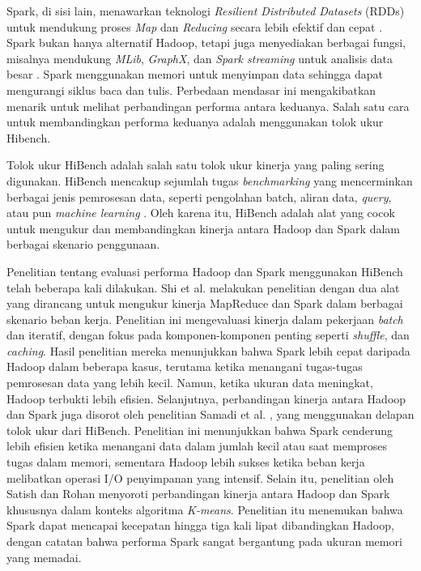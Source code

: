 Spark, di sisi lain, menawarkan teknologi \textit{Resilient Distributed Datasets} (RDDs) untuk mendukung proses \textit{Map} dan \textit{Reducing} secara lebih efektif dan cepat \cite{ahmadvandGapproxUsingGallup2019}. Spark bukan hanya alternatif Hadoop, tetapi juga menyediakan berbagai fungsi, misalnya mendukung \textit{MLib}, \textit{GraphX}, dan \textit{Spark streaming} untuk analisis data besar \cite{zahariaSparkClusterComputing2010}. Spark menggunakan memori untuk menyimpan data sehingga dapat mengurangi siklus baca dan tulis. Perbedaan mendasar ini mengakibatkan menarik untuk melihat perbandingan performa antara keduanya. Salah satu cara untuk membandingkan performa keduanya adalah menggunakan tolok ukur Hibench.

Tolok ukur HiBench adalah salah satu tolok ukur kinerja yang paling sering digunakan. HiBench mencakup sejumlah tugas \textit{benchmarking} yang mencerminkan berbagai jenis pemrosesan data, seperti pengolahan batch, aliran data, \textit{query}, atau pun \textit{machine learning} \cite{huangHiBenchBenchmarkSuite}. Oleh karena itu, HiBench adalah alat yang cocok untuk mengukur dan membandingkan kinerja antara Hadoop dan Spark dalam berbagai skenario penggunaan.

Penelitian tentang evaluasi performa Hadoop dan Spark menggunakan HiBench telah beberapa kali dilakukan. Shi et al. \cite{shiClashTitansMapReduce2015} melakukan penelitian dengan dua alat yang dirancang untuk mengukur kinerja MapReduce dan Spark dalam berbagai skenario beban kerja. Penelitian ini mengevaluasi kinerja dalam pekerjaan \textit{batch} dan iteratif, dengan fokus pada komponen-komponen penting seperti \textit{shuffle}, dan \textit{caching}. Hasil penelitian mereka menunjukkan bahwa Spark lebih cepat daripada Hadoop dalam beberapa kasus, terutama ketika menangani tugas-tugas pemrosesan data yang lebih kecil. Namun, ketika ukuran data meningkat, Hadoop terbukti lebih efisien. Selanjutnya, perbandingan kinerja antara Hadoop dan Spark juga disorot oleh penelitian Samadi et al. \cite{samadiComparativeStudyHadoop2016}, yang menggunakan delapan tolok ukur dari HiBench. Penelitian ini menunjukkan bahwa Spark cenderung lebih efisien ketika menangani data dalam jumlah kecil atau saat memproses tugas dalam memori, sementara Hadoop lebih sukses ketika beban kerja melibatkan operasi I/O penyimpanan yang intensif. Selain itu, penelitian oleh Satish dan Rohan \cite{gopalaniComparingApacheSpark2015} menyoroti perbandingan kinerja antara Hadoop dan Spark khususnya dalam konteks algoritma \textit{K-means}. Penelitian itu menemukan bahwa Spark dapat mencapai kecepatan hingga tiga kali lipat dibandingkan Hadoop, dengan catatan bahwa performa Spark sangat bergantung pada ukuran memori yang memadai.

